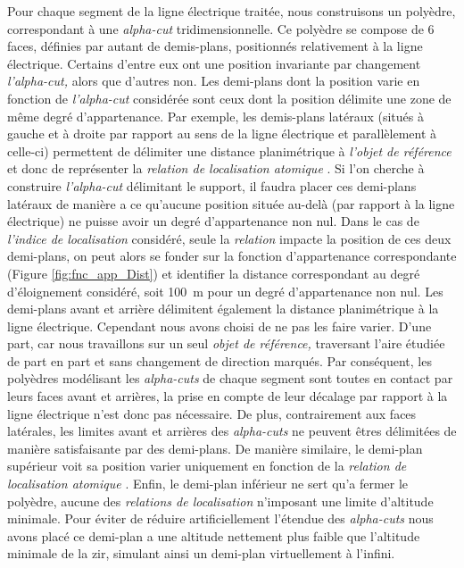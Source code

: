 Pour chaque segment de la ligne électrique traitée, nous construisons
un polyèdre, correspondant à une \emph{alpha-cut}
tridimensionnelle. Ce polyèdre se compose de 6 faces, définies par
autant de demis-plans, positionnés relativement à la ligne
électrique. Certains d'entre eux ont une position invariante par
changement \emph{l'alpha-cut,} alors que d'autres non. Les demi-plans
dont la position varie en fonction de \emph{l'alpha-cut} considérée
sont ceux dont la position délimite une zone de même degré
d'appartenance. Par exemple, les demis-plans latéraux (\ie situés à
gauche et à droite par rapport au sens de la ligne électrique et
parallèlement à celle-ci) permettent de délimiter une distance
planimétrique à \emph{l'objet de référence} et donc de représenter la
\emph{relation de localisation atomique}
. Si
l'on cherche à construire \emph{l'alpha-cut} délimitant le support, il
faudra placer ces demi-plans latéraux de manière a ce qu'aucune
position située au-delà (par rapport à la ligne électrique) ne puisse
avoir un degré d'appartenance non nul. Dans le cas de \emph{l'indice
  de localisation} considéré, seule la \emph{relation}
impacte la position de ces deux demi-plans, on peut alors se fonder
sur la fonction d'appartenance correspondante (Figure
\ref{fig:fnc_app_Dist}) et identifier la distance correspondant au
degré d'éloignement considéré, soit \SI{100}{\meter} pour un degré
d'appartenance non nul. Les demi-plans avant et arrière délimitent
également la distance planimétrique à la ligne électrique. Cependant
nous avons choisi de ne pas les faire varier. D'une part, car nous
travaillons sur un seul \emph{objet de référence,} traversant l'aire
étudiée de part en part et sans changement de direction marqués. Par
conséquent, les polyèdres modélisant les \emph{alpha-cuts} de chaque
segment sont toutes en contact par leurs faces avant et arrières, la
prise en compte de leur décalage par rapport à la ligne électrique
n'est donc pas nécessaire. De plus, contrairement aux faces latérales,
les limites avant et arrières des \emph{alpha-cuts} ne peuvent êtres
délimitées de manière satisfaisante par des demi-plans.
%
De manière similaire, le demi-plan supérieur voit sa position varier
uniquement en fonction de la \emph{relation de localisation atomique}
.
%
Enfin, le demi-plan inférieur ne sert qu'a fermer le polyèdre, aucune
des \emph{relations de localisation} n'imposant une limite d'altitude
minimale. Pour éviter de réduire artificiellement l'étendue des
\emph{alpha-cuts} nous avons placé ce demi-plan a une altitude
nettement plus faible que l'altitude minimale de la zir,
simulant ainsi un demi-plan virtuellement à l'infini.

